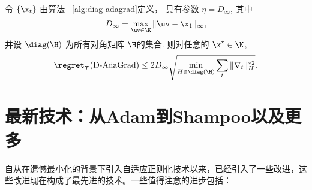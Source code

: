 \begin{theorem}
\label{theorem:diagonal-adagrad-main}
令	$\{\x_t\}$ 由算法 ~\ref{alg:diag-adagrad}定义， 具有参数 $ \eta  = {D_\infty}$, 其中
$$D_\infty = \max_{\uv \in \K}  \|\uv - \x_1\|_\infty ,$$  
并设 $\diag(\H)$ 为所有对角矩阵 $\H$的集合. 则对任意的 $\x^\star \in \K$,
\begin{equation*} 
\regret_{T}(\mbox{D-AdaGrad}) \le 2 D_\infty    \sqrt{  \min_{H \in \diag(\H)} \sum_t \|\nabla_t \|_H^{* 2}  } .
\end{equation*}
\end{theorem}



\section{
    最新技术：从Adam到Shampoo以及更多
    } 

自从在遗憾最小化的背景下引入自适应正则化技术以来，已经引入了一些改进，这些改进现在构成了最先进的技术。一些值得注意的进步包括：

